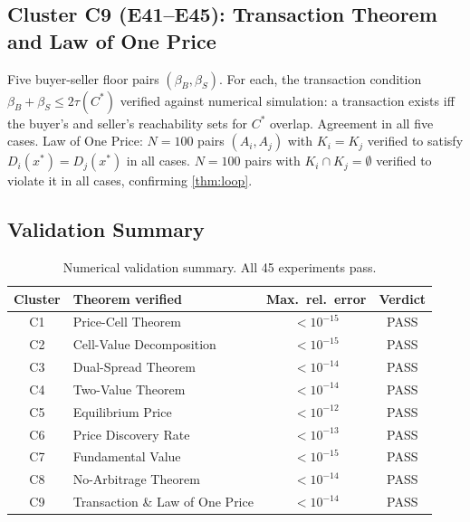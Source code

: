 \documentclass[twocolumn,11pt,a4paper]{article}
\theoremstyle{remark}
\newcommand{\tol}{\tau}
\begin{document}
\subsection*{Cluster C9 (E41--E45): Transaction Theorem and Law of One Price}

Five buyer-seller floor pairs $(\beta_B, \beta_S)$.  For each, the
transaction condition $\beta_B + \beta_S \le 2\tol(C^*)$ verified against
numerical simulation: a transaction exists iff the buyer's and seller's
reachability sets for $C^*$ overlap.  Agreement in all five cases.
Law of One Price: $N=100$ pairs $(A_i, A_j)$ with $K_i = K_j$ verified to
satisfy $D_i(x^*) = D_j(x^*)$ in all cases.  $N=100$ pairs with $K_i \cap
K_j = \emptyset$ verified to violate it in all cases, confirming
\cref{thm:loop}.

\subsection*{Validation Summary}

\begin{table}[!htbp]
\centering
\caption{Numerical validation summary. All 45 experiments pass.}
\label{tab:validation}
\small
\begin{tabular}{@{}clcc@{}}
\toprule
Cluster & Theorem verified & Max.\ rel.\ error & Verdict \\
\midrule
C1 & Price-Cell Theorem          & $< 10^{-15}$  & PASS \\
C2 & Cell-Value Decomposition    & $< 10^{-15}$  & PASS \\
C3 & Dual-Spread Theorem         & $< 10^{-14}$  & PASS \\
C4 & Two-Value Theorem           & $< 10^{-14}$  & PASS \\
C5 & Equilibrium Price           & $< 10^{-12}$  & PASS \\
C6 & Price Discovery Rate        & $< 10^{-13}$  & PASS \\
C7 & Fundamental Value           & $< 10^{-15}$  & PASS \\
C8 & No-Arbitrage Theorem        & $< 10^{-14}$  & PASS \\
C9 & Transaction \& Law of One Price & $< 10^{-14}$ & PASS \\
\bottomrule
\end{tabular}
\end{table}
\end{document}
